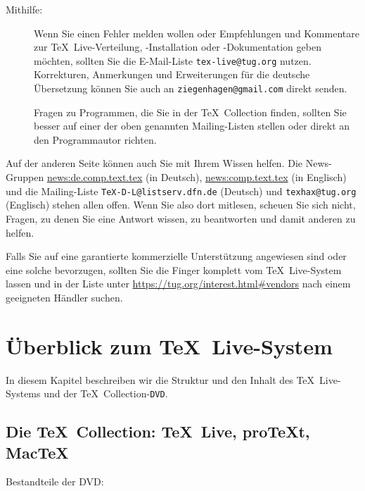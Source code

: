 \documentclass[12pt,ngerman,a4paper,fullparskip]{scrreprt}
\newcommand{\TL}{\TeX\ Live\xspace}
\newcommand{\email}[1]{\texttt{#1}}
\newcommand{\acro}[1]{\texttt{#1}}
\def\TK{\TeX\ Collection}
\providecommand*{\DVD}{\acro{DVD}\xspace}
\begin{document}
\begin{description}
\item [Mithilfe:]
      Wenn Sie einen Fehler melden wollen oder Empfehlungen und Kommentare
      zur \TL-Verteilung, -Installation oder -Dokumentation geben möchten, sollten Sie die
      E-Mail-Liste \email{tex-live@tug.org} nutzen. 
      Korrekturen, Anmerkungen und Erweiterungen für die deutsche Übersetzung können Sie auch
      an \email{ziegenhagen@gmail.com} direkt senden.

      Fragen zu Programmen, die Sie in der {\TK} finden, sollten Sie besser auf
      einer der oben genannten Mailing-Listen stellen oder direkt an den Programmautor
      richten.
\end{description}

\noindent Auf der anderen Seite können auch Sie mit Ihrem Wissen helfen. Die News-Gruppen
\url{news:de.comp.text.tex} (in Deutsch), \url{news:comp.text.tex} (in Englisch) und
die Mailing-Liste \email{TeX-D-L@listserv.dfn.de} (Deutsch) und \email{texhax@tug.org} (Englisch)
stehen allen offen. Wenn Sie also dort mitlesen, scheuen Sie sich nicht, Fragen,
zu denen Sie eine Antwort wissen, zu beantworten und damit anderen zu helfen.

Falls Sie auf eine garantierte kommerzielle Unterstützung angewiesen sind oder eine solche
bevorzugen, sollten Sie die Finger komplett vom \TL-System lassen und in der Liste unter \url{https://tug.org/interest.html#vendors} nach einem geeigneten Händler suchen.

\chapter{Überblick zum \TL-System}\label{sec:overview-tl}

In diesem Kapitel beschreiben wir die Struktur und den Inhalt des \TL-Systems und der \TK-\DVD.

\section[Die \protect\TeX\protect\ Collection: \TL, pro\TeX{}t, Mac\TeX]{Die \protect\TeX\protect\ Collection: \TL, pro\TeX{}t, Mac\TeX}\label{sec:tl-coll-dists}

Bestandteile der DVD:
\end{document}
